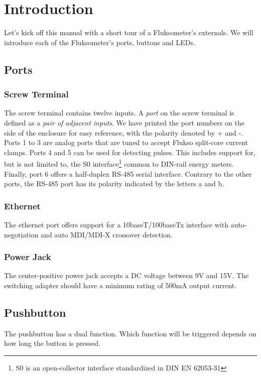 \chapter{Introduction}

Let's kick off this manual with a short tour of a Fluksometer's externals. We will introduce each of the Fluksometer's ports, buttons and LEDs. 

\section{Ports}

\subsection{Screw Terminal}
\label{sec:introduction_ports_screw}
The screw terminal contains twelve inputs. A \emph{port} on the screw terminal is defined as a \emph{pair of adjacent inputs}. We have printed the port numbers on the side of the enclosure for easy reference, with the polarity denoted by + and -. Ports 1 to 3 are analog ports that are tuned to accept Flukso split-core current clamps. Ports 4 and 5 can be used for detecting pulses. This includes support for, but is not limited to, the S0 interface\footnote{S0 is an open-collector interface standardized in DIN EN 62053-31} common to DIN-rail energy meters. Finally, port 6 offers a half-duplex RS-485 serial interface. Contrary to the other ports, the RS-485 port has its polarity indicated by the letters a and b.

\subsection{Ethernet}
The ethernet port offers support for a 10baseT/100baseTx interface with auto-negotiation and auto MDI/MDI-X crossover detection.

\subsection{Power Jack}
The center-positive power jack accepts a DC voltage between 9V and 15V. The switching adapter should have a minimum rating of 500mA output current.


\section{Pushbutton}
\label{sec:introduction_pushbutton}

The pushbutton has a dual function. Which function will be triggered depends on how long the button is pressed.

